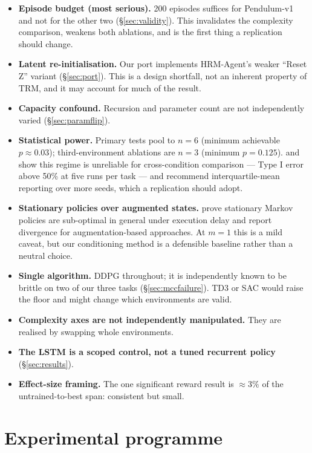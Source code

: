 \documentclass[11pt]{article}
\begin{document}
\begin{itemize}
  \item \textbf{Episode budget (most serious).} 200 episodes suffices for Pendulum-v1 and not for the other two (\S\ref{sec:validity}). This invalidates the complexity comparison, weakens both ablations, and is the first thing a replication should change.
  \item \textbf{Latent re-initialisation.} Our port implements HRM-Agent's weaker ``Reset Z'' variant (\S\ref{sec:port}). This is a design shortfall, not an inherent property of TRM, and it may account for much of the result.
  \item \textbf{Capacity confound.} Recursion and parameter count are not independently varied (\S\ref{sec:paramflip}).
  \item \textbf{Statistical power.} Primary tests pool to $n=6$ (minimum achievable $p \approx 0.03$); third-environment ablations are $n=3$ (minimum $p=0.125$). \citet{henderson2018matters} and \citet{agarwal2021precipice} show this regime is unreliable for cross-condition comparison --- Type I error above 50\% at five runs per task --- and recommend interquartile-mean reporting over more seeds, which a replication should adopt.
  \item \textbf{Stationary policies over augmented states.} \citet{derman2021delayed} prove stationary Markov policies are sub-optimal in general under execution delay and report divergence for augmentation-based approaches. At $m=1$ this is a mild caveat, but our conditioning method is a defensible baseline rather than a neutral choice.
  \item \textbf{Single algorithm.} DDPG throughout; it is independently known to be brittle on two of our three tasks (\S\ref{sec:mccfailure}). TD3 or SAC would raise the floor and might change which environments are valid.
  \item \textbf{Complexity axes are not independently manipulated.} They are realised by swapping whole environments.
  \item \textbf{The LSTM is a scoped control, not a tuned recurrent policy} (\S\ref{sec:results}).
  \item \textbf{Effect-size framing.} The one significant reward result is ${\approx}3\%$ of the untrained-to-best span: consistent but small.
\end{itemize}

\section{Experimental programme}
\label{sec:programme}
\end{document}
